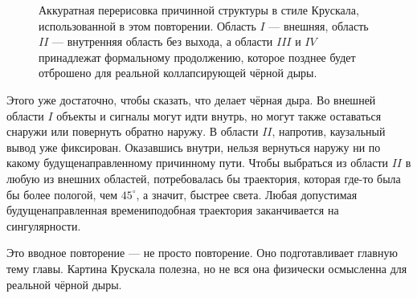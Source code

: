 \begin{figure}[htbp]
\centering
{}
\caption{Аккуратная перерисовка причинной структуры в стиле Крускала, использованной в этом повторении. Область \(I\) — внешняя, область \(II\) — внутренняя область без выхода, а области \(III\) и \(IV\) принадлежат формальному продолжению, которое позднее будет отброшено для реальной коллапсирующей чёрной дыры.}
\end{figure}

Этого уже достаточно, чтобы сказать, что делает чёрная дыра. Во внешней области \(I\) объекты и сигналы могут идти внутрь, но могут также оставаться снаружи или повернуть обратно наружу. В области \(II\), напротив, каузальный вывод уже фиксирован. Оказавшись внутри, нельзя вернуться наружу ни по какому будущенаправленному причинному пути. Чтобы выбраться из области \(II\) в любую из внешних областей, потребовалась бы траектория, которая где-то была бы более пологой, чем \(45^\circ\), а значит, быстрее света. Любая допустимая будущенаправленная времениподобная траектория заканчивается на сингулярности.

Это вводное повторение — не просто повторение. Оно подготавливает главную тему главы. Картина Крускала полезна, но не вся она физически осмысленна для реальной чёрной дыры.

\begin{classroomqa}
\end{classroomqa}


